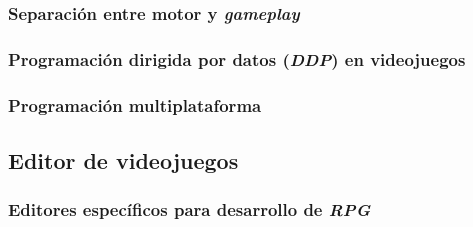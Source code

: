 \subsubsection{Separación entre motor y \textit{gameplay}}

\subsubsection{Programación dirigida por datos (\textit{DDP}) en videojuegos}

\subsubsection{Programación multiplataforma}

\subsection{Editor de videojuegos}

\subsubsection{Editores específicos para desarrollo de \textit{RPG}}

